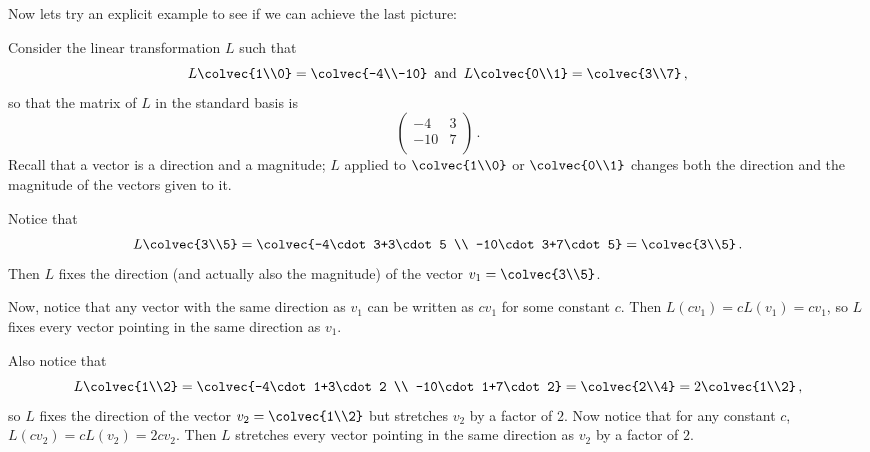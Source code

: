 Now lets try an explicit example to see if we can achieve the last picture:

\begin{example}
Consider the linear transformation $L$ such that $$L\colvec{1\\0}=\colvec{-4\\-10}\,  \mbox{ and }\, L\colvec{0\\1}=\colvec{3\\7}\, ,$$ so that the matrix of $L$ in the standard basis is $$\begin{pmatrix}
-4 & 3 \\
-10 & 7 \\
\end{pmatrix}\, .$$  Recall that a vector is a direction and a magnitude; $L$ applied to $\colvec{1\\0}$ or $\colvec{0\\1}$ changes both the direction and the magnitude of the vectors given to it.

Notice that $$L\colvec{3\\5}=\colvec{-4\cdot 3+3\cdot 5 \\ -10\cdot 3+7\cdot 5}=\colvec{3\\5}\, .$$  Then $L$ fixes the  direction (and actually also the magnitude) of the vector $v_1=\colvec{3\\5}$.  





Now, notice that any vector with the same direction as $v_1$ can be written as $cv_1$ for some constant $c$.  Then $L(cv_1)=cL(v_1)=cv_1$, so $L$ fixes every vector pointing in the same direction as $v_1$.

Also notice that $$L\colvec{1\\2}=\colvec{-4\cdot 1+3\cdot 2 \\ -10\cdot 1+7\cdot 2}=\colvec{2\\4}=2\colvec{1\\2}\, ,$$ so $L$ fixes the direction of the vector $v_2=\colvec{1\\2}$ but stretches $v_2$ by a factor of $2$.  Now notice that for any constant $c$, $L(cv_2)=cL(v_2)=2cv_2$.  Then $L$ stretches every vector pointing in the same direction as $v_2$ by a factor of $2$.

\end{example}

